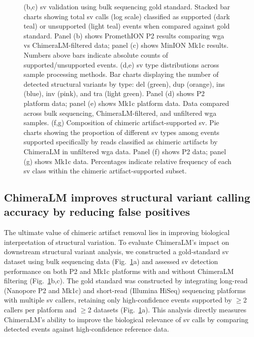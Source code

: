 \documentclass[pdflatex,sn-nature]{sn-jnl}%
\theoremstyle{thmstyleone}%
\theoremstyle{thmstyletwo}%
\theoremstyle{thmstylethree}%
\begin{document}
\begin{figure}[!ht]
{		(b,c) \gls{sv} validation using bulk sequencing gold standard. Stacked bar charts showing total \gls{sv} calls (log scale) classified as supported (dark teal) or unsupported (light teal) events when compared against gold standard. Panel (b) shows PromethION P2 results comparing \gls{wga} vs ChimeraLM-filtered data; panel (c) shows MinION Mk1c results. Numbers above bars indicate absolute counts of supported/unsupported events.
		(d,e) \gls{sv} type distributions across sample processing methods. Bar charts displaying the number of detected structural variants by type: \gls{del} (green), \gls{dup} (orange), \gls{ins} (blue), \gls{inv} (pink), and \gls{tra} (light green). Panel (d) shows P2 platform data; panel (e) shows Mk1c platform data. Data compared across bulk sequencing, ChimeraLM-filtered, and unfiltered \gls{wga} samples.
		(f,g) Composition of chimeric artifact-supported \gls{sv}. Pie charts showing the proportion of different \gls{sv} types among events supported specifically by reads classified as chimeric artifacts by ChimeraLM in unfiltered \gls{wga} data. Panel (f) shows P2 data; panel (g) shows Mk1c data. Percentages indicate relative frequency of each \gls{sv} class within the chimeric artifact-supported subset.}\label{fig:figure3}
\end{figure}

\subsection*{ChimeraLM improves structural variant calling accuracy by reducing false positives}

The ultimate value of chimeric artifact removal lies in improving biological interpretation of structural variation.
To evaluate ChimeraLM's impact on downstream structural variant analysis, we constructed a gold-standard \gls{sv} dataset using bulk sequencing data (Fig.~\ref{fig:figure3}a) and assessed \gls{sv} detection performance on both P2 and Mk1c platforms with and without ChimeraLM filtering (Fig.~\ref{fig:figure3}b,c).
The gold standard was constructed by integrating long-read (Nanopore P2 and Mk1c) and short-read (Illumina HiSeq) sequencing platforms with multiple \gls{sv} callers, retaining only high-confidence events supported by $\geq$2 callers per platform and $\geq$2 datasets (Fig.~\ref{fig:figure3}a).
This analysis directly measures ChimeraLM's ability to improve the biological relevance of \gls{sv} calls by comparing detected events against high-confidence reference data.
\end{document}
